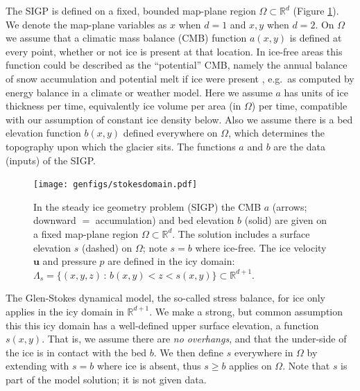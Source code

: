 \documentclass[letterpaper,final,12pt,reqno]{amsart}
\theoremstyle{claim}
\newcommand{\RR}{\mathbb{R}}
\newcommand{\bu}{\mathbf{u}}
\numberwithin{equation}{section}
\numberwithin{figure}{section}
\numberwithin{table}{section}
\numberwithin{theorem}{section}
\begin{document}
The SIGP is defined on a fixed, bounded map-plane region $\Omega \subset \RR^d$ (Figure \ref{fig:stokesdomain}).  We denote the map-plane variables as $x$ when $d=1$ and $x,y$ when $d=2$.  On $\Omega$ we assume that a climatic mass balance (CMB) function $a(x,y)$ is defined at every point, whether or not ice is present at that location.  In ice-free areas this function could be described as the ``potential'' CMB, namely the annual balance of snow accumulation and potential melt if ice were present \cite{Cogleyetal2011}, e.g.~as computed by energy balance in a climate or weather model.  Here we assume $a$ has units of ice thickness per time, equivalently ice volume per area (in $\Omega$) per time, compatible with our assumption of constant ice density below.  Also we assume there is a bed elevation function $b(x,y)$ defined everywhere on $\Omega$, which determines the topography upon which the glacier sits.  The functions $a$ and $b$ are the data (inputs) of the SIGP.

\begin{figure}[t]
\begin{center}
\texttt{[image: genfigs/stokesdomain.pdf]}
\end{center}
\caption{In the steady ice geometry problem (SIGP) the CMB $a$ (arrows; downward $=$ accumulation) and bed elevation $b$ (solid) are given on a fixed map-plane region $\Omega \subset \RR^d$.  The solution includes a surface elevation $s$ (dashed) on $\Omega$; note $s=b$ where ice-free.  The ice velocity $\bu$ and pressure $p$ are defined in the icy domain: $\Lambda_s = \{(x,y,z)\,:\,b(x,y) < z < s(x,y)\} \subset \RR^{d+1}$.}
\label{fig:stokesdomain}
\end{figure}

The Glen-Stokes dynamical model, the so-called stress balance, for ice only applies in the icy domain in $\RR^{d+1}$.  We make a strong, but common \cite[for example]{IsaacStadlerGhattas2015,Jouvetetal2008,Lengetal2012,WirbelJarosch2020} assumption this this icy domain has a well-defined upper surface elevation, a function $s(x,y)$.  That is, we assume there are \emph{no overhangs}, and that the under-side of the ice is in contact with the bed $b$.  We then define $s$ everywhere in $\Omega$ by extending with $s=b$ where ice is absent, thus $s\ge b$ applies on $\Omega$.  Note that $s$ is part of the model solution; it is not given data.
\end{document}
